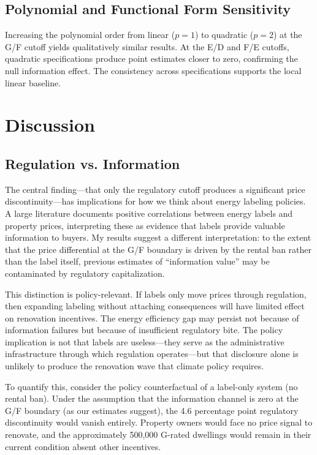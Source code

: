 \documentclass[12pt]{article}
\begin{document}
\subsection{Polynomial and Functional Form Sensitivity}

Increasing the polynomial order from linear ($p=1$) to quadratic ($p=2$) at the G/F cutoff yields qualitatively similar results. At the E/D and F/E cutoffs, quadratic specifications produce point estimates closer to zero, confirming the null information effect. The consistency across specifications supports the local linear baseline.


\section{Discussion}

\subsection{Regulation vs. Information}

The central finding---that only the regulatory cutoff produces a significant price discontinuity---has implications for how we think about energy labeling policies. A large literature \citep{fuerst2015does, hyland2013value, brounen2012energy} documents positive correlations between energy labels and property prices, interpreting these as evidence that labels provide valuable information to buyers. My results suggest a different interpretation: to the extent that the price differential at the G/F boundary is driven by the rental ban rather than the label itself, previous estimates of ``information value'' may be contaminated by regulatory capitalization.

This distinction is policy-relevant. If labels only move prices through regulation, then expanding labeling without attaching consequences will have limited effect on renovation incentives. The energy efficiency gap \citep{allcott2014short, gerarden2017assessing} may persist not because of information failures but because of insufficient regulatory bite. The policy implication is not that labels are useless---they serve as the administrative infrastructure through which regulation operates---but that disclosure alone is unlikely to produce the renovation wave that climate policy requires.

To quantify this, consider the policy counterfactual of a label-only system (no rental ban). Under the assumption that the information channel is zero at the G/F boundary (as our estimates suggest), the 4.6 percentage point regulatory discontinuity would vanish entirely. Property owners would face no price signal to renovate, and the approximately 500,000 G-rated dwellings would remain in their current condition absent other incentives.
\end{document}
